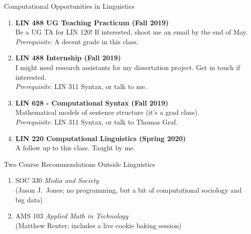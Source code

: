 \documentclass[xcolor={usenames,svgnames,x11names,dvipsnames,table}]{beamer}
\begin{document}
\begin{frame}{Computational Opportunities in Linguistics}
    \begin{enumerate}
            \item \textbf{LIN 488 UG Teaching Practicum (Fall 2019)}\\
            Be a UG TA for LIN 120! \alert{If interested, shoot me an email by the end of May.}
             \emph{Prerequisite}: A decent grade in this class.
        \item \textbf{LIN 488 Internship (Fall 2019)}\\
           I might need research assistants for my dissertation project. Get in touch if interested.\\
            \emph{Prerequisite}: LIN 311 Syntax, or talk to me.
        \item \textbf{LIN 628 - Computational Syntax (Fall 2019)}\\
            Mathematical models of sentence structure (it's a grad class).\\
            \emph{Prerequisite}: LIN 311 Syntax, or talk to Thomas Graf.
                    \item \textbf{LIN 220 Computational Linguistics (Spring 2020)}\\
            A follow up to this class. Taught by me.
    \end{enumerate}
\end{frame}


\begin{frame}{Two Course Recommendations Outside Linguistics}
    \begin{enumerate}
        \item SOC 330 \emph{Media and Society}\\
            (Jason J.~Jones; no programming, but a bit of computational sociology and big data)
        \item AMS 103 \emph{Applied Math in Technology}\\
            (Matthew Reuter; includes a live cookie baking session)
    \end{enumerate}
\end{frame}
\end{document}
